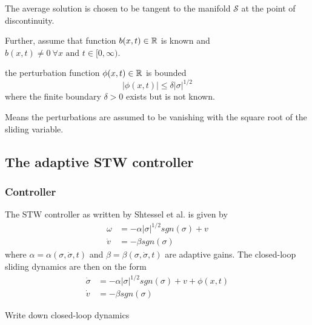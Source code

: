 The average solution is chosen to be tangent to the manifold $\mathcal{S}$ at the point of discontinuity.
\begin{assumption}
    Further, assume that function $b(x,t) \in \mathbb{R}$ is known and $b(x,t) \neq 0 \ \forall x \text{ and } t \in [0, \infty)$. 
\end{assumption}
\begin{assumption}
    the perturbation function $\phi(x, t) \in \mathbb{R}$ is bounded 
        \begin{equation}
          |\phi(x,t)| \leq \delta |\sigma|^{1/2}
          \label{eq:shtessel-a4}
        \end{equation} 
        where the finite boundary $\delta > 0$ exists but is not known.
\end{assumption}
\begin{rmk}
    Means the perturbations are assumed to be vanishing with the square root of the sliding variable.
\end{rmk}

\subsection{The adaptive STW controller}
  \subsubsection{Controller}
       The STW controller as written by Shtessel et al. \cite{Sht:10} is given by
       \begin{equation}
          \begin{split}
            \omega &= -\alpha|\sigma|^{1/2}sgn(\sigma) + v \\
            \dot{v} &= -\beta sgn (\sigma)
          \end{split}
          \label{eq:shtessel-stw}
       \end{equation}
       where $\alpha = \alpha(\sigma, \dot{\sigma}, t)$ and $\beta = \beta(\sigma, \dot{\sigma}, t)$ are adaptive gains. The closed-loop sliding dynamics are then on the form
       \begin{equation}
        \begin{split}
          \dot{\sigma} &= -\alpha|\sigma|^{1/2}sgn(\sigma) + v + \phi(x,t) \\
          \dot{v} &= -\beta sgn(\sigma)
          \label{eq:shtessel-closed-loop}
        \end{split}
       \end{equation}
\begin{rmk}
    Write down closed-loop dynamics
\end{rmk}

